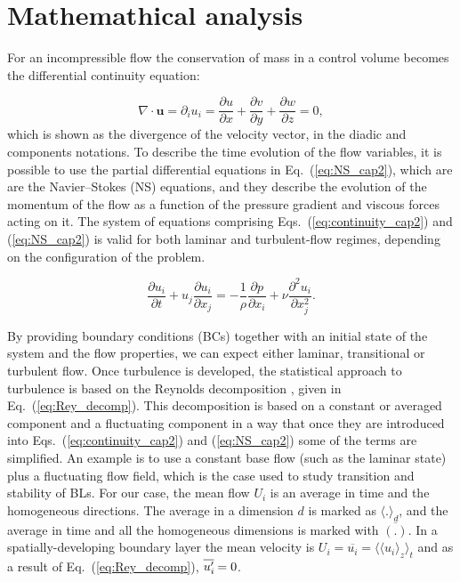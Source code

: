 \section{Mathemathical analysis}

For an incompressible flow the conservation of mass in a control volume becomes the differential continuity equation:

\begin{equation}
\label{eq:continuity_cap2}
    \nabla \cdot \pmb{u} = \partial_i u_i = 
    \frac{\partial u}{\partial x} + \frac{\partial v}{\partial y} + \frac{\partial w}{\partial z} = 0,
\end{equation}
which is shown as the divergence of the velocity vector, in the diadic and components notations.
To describe the time evolution of the flow variables, it is possible to use the partial differential equations in Eq.~(\ref{eq:NS_cap2}), which are are the Navier--Stokes (NS) equations, and they describe the evolution of the momentum of the flow as a function of the pressure gradient and viscous forces acting on it. The system of equations comprising Eqs.~(\ref{eq:continuity_cap2}) and (\ref{eq:NS_cap2}) is valid for both laminar and turbulent-flow regimes, depending on the configuration of the problem.

\begin{equation}
    \label{eq:NS_cap2}
    \frac {\partial u_i} {\partial t}  + u_j \frac {\partial u_i} {\partial x_j} =
    -\frac {1} {\rho} \frac {\partial p} {\partial x_i} +  \nu \frac {\partial^2 u_i} {\partial x_j^2}.
\end{equation}

By providing boundary conditions (BCs) together with an initial state of the system and the flow properties, we can expect either laminar, transitional or turbulent flow.
Once turbulence is developed, the statistical approach to turbulence is based on the Reynolds decomposition \citep{Rey_decomp}, given in Eq.~(\ref{eq:Rey_decomp}). This decomposition is based on a constant or averaged component and a fluctuating component in a way that once they are introduced into Eqs.~(\ref{eq:continuity_cap2}) and (\ref{eq:NS_cap2}) some of the terms are simplified. An example is to use a constant base flow (such as the laminar state) plus a fluctuating flow field, which is the case used to study transition and stability of BLs. 
For our case, the mean flow $U_i$ is an average in time and the homogeneous directions. The average in a dimension $d$ is marked as $\langle . \rangle_d$, and the average in time and all the homogeneous dimensions is marked with $\overline{(.)}$. In a spatially-developing boundary layer the mean velocity is $U_i = \overline{u_i} =\langle \langle u_i \rangle_z \rangle_t$ and as a result of Eq.~(\ref{eq:Rey_decomp}), $\overline{u_i^{\prime}\mkern-1.2mu}=0$. 

